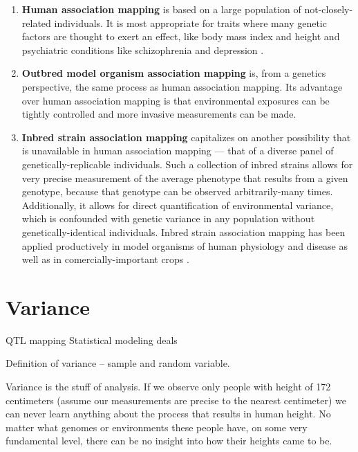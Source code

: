 \begin{enumerate}
	\item \textbf{Human association mapping} is based on a large population of not-closely-related individuals.
	It is most appropriate for traits where many genetic factors are thought to exert an effect, like body mass index \citep{Speliotes2010,Locke2015} and height \citep{Allen2010,Wood2014-fh}and psychiatric conditions like schizophrenia \citep{Ripke2014a} and depression \citep{PGC2017}.
	\item \textbf{Outbred model organism association mapping} is, from a genetics perspective, the same process as human association mapping.
	Its advantage over human association mapping is that environmental exposures can be tightly controlled and more invasive measurements can be made.
	\item \textbf{Inbred strain association mapping} capitalizes on another possibility that is unavailable in human association mapping --- that of a diverse panel of genetically-replicable individuals.
	Such a collection of inbred strains allows for very precise measurement of the average phenotype that results from a given genotype, because that genotype can be observed arbitrarily-many times.
	Additionally, it allows for direct quantification of environmental variance, which is confounded with genetic variance in any population without genetically-identical individuals.
	Inbred strain association mapping has been applied productively in model organisms of human physiology and disease \citep{TheComplexTraitConsortium2004,MacKay2012,King2012} as well as in comercially-important crops \citep{McMullen2009,Bandillo2013}.
\end{enumerate}

\section{Variance}

QTL mapping Statistical modeling deals 

Definition of variance -- sample and random variable.

Variance is the stuff of analysis.
If we observe only people with height of 172 centimeters (assume our measurements are precise to the nearest centimeter) we can never learn anything about the process that results in human height.
No matter what genomes or environments these people have, on some very fundamental level, there can be no insight into how their heights came to be.


